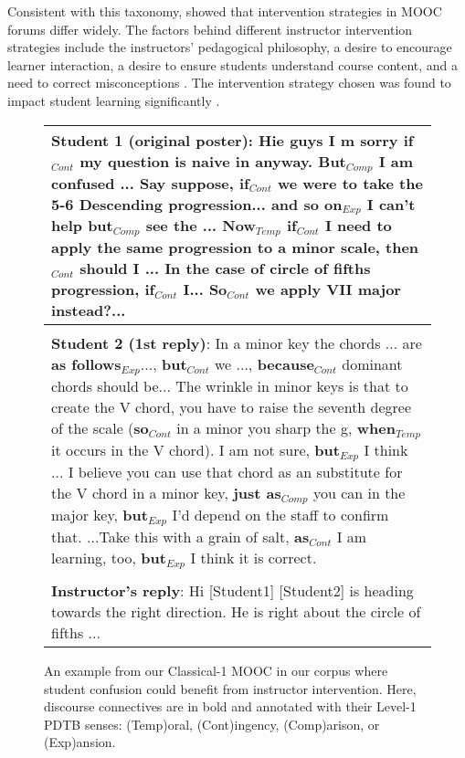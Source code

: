 \documentclass[letterpaper]{article}
\begin{document}
Consistent with this taxonomy, \citeauthor{chandrasekaran2015learning} 
showed that intervention strategies in MOOC forums differ widely.
The factors behind different instructor intervention strategies include the 
instructors' pedagogical philosophy, a desire to encourage learner 
interaction, a desire to ensure students understand course content, and a 
need to correct misconceptions \cite{phirangee_fill_2016}. 
The intervention strategy chosen was found to impact student learning 
significantly \cite{mazzolini2003,mazzolini2007}.

\begin{figure}
\small 
\begin{tabular}{|p{7.8cm}|}
\hline 

\textbf{Student 1 (original poster)}: Hie guys I m sorry
\textbf{if}$_{Cont}$ my question is naive in
anyway. \textbf{But}$_{Comp}$ I am confused ...  Say suppose,
\textbf{if}$_{Cont}$ we were to take the 5-6 Descending
progression...  \textbf{and so on}$_{Exp}$ I can’t help
\textbf{but}$_{Comp}$ see the ...  \textbf{Now}$_{Temp}$ {\bf
if}$_{Cont}$ I need to apply the same progression to a minor
scale, \textbf{then}$_{Cont}$ should I ... In the case of circle
of fifths progression, \textbf{if}$_{Cont}$
I... \textbf{So}$_{Cont}$ we apply VII major instead?... \\

\hline \\

\textbf{Student 2 (1st reply)}: In a minor key the chords ... are
\textbf{as follows}$_{Exp}$..., \textbf{but}$_{Cont}$ we ...,
\textbf{because}$_{Cont}$ dominant chords should be... The
wrinkle in minor keys is that to create the V chord, you have to
raise the seventh degree of the scale (\textbf{so}$_{Cont}$ in a
minor you sharp the g, \textbf{when$_{Temp}$} it occurs in the V
chord). I am not sure, \textbf{but}$_{Exp}$ I think ... I believe
you can use that chord as an substitute for the V chord in a
minor key, \textbf{just as}$_{Comp}$ you can in the major key,
\textbf{but}$_{Exp}$ I'd depend on the staff to confirm
that. ...Take this with a grain of salt, \textbf{as}$_{Cont}$ I
am learning, too, \textbf{but}$_{Exp}$ I think it is correct. \\

\hline \\

\textbf{Instructor's reply}: Hi [Student1] [Student2] is heading towards 
the right direction. He is right about the circle of fifths ...  \\

\hline
\end{tabular}
\caption{An example from our {\sc Classical-1} MOOC in our corpus
  where student confusion could benefit from instructor intervention.
  Here, discourse connectives are in bold and annotated with their
  Level-1 PDTB senses: (Temp)oral, (Cont)ingency, (Comp)arison, or
  (Exp)ansion.}
\vspace{-4mm}
\label{fig:example-intro}
\end{figure}
\end{document}
